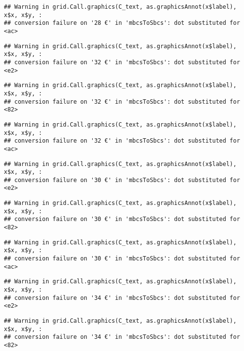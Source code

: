 \documentclass[
]{article}
\begin{document}
\begin{verbatim}
## Warning in grid.Call.graphics(C_text, as.graphicsAnnot(x$label), x$x, x$y, :
## conversion failure on '28 €' in 'mbcsToSbcs': dot substituted for <ac>
\end{verbatim}

\begin{verbatim}
## Warning in grid.Call.graphics(C_text, as.graphicsAnnot(x$label), x$x, x$y, :
## conversion failure on '32 €' in 'mbcsToSbcs': dot substituted for <e2>
\end{verbatim}

\begin{verbatim}
## Warning in grid.Call.graphics(C_text, as.graphicsAnnot(x$label), x$x, x$y, :
## conversion failure on '32 €' in 'mbcsToSbcs': dot substituted for <82>
\end{verbatim}

\begin{verbatim}
## Warning in grid.Call.graphics(C_text, as.graphicsAnnot(x$label), x$x, x$y, :
## conversion failure on '32 €' in 'mbcsToSbcs': dot substituted for <ac>
\end{verbatim}

\begin{verbatim}
## Warning in grid.Call.graphics(C_text, as.graphicsAnnot(x$label), x$x, x$y, :
## conversion failure on '30 €' in 'mbcsToSbcs': dot substituted for <e2>
\end{verbatim}

\begin{verbatim}
## Warning in grid.Call.graphics(C_text, as.graphicsAnnot(x$label), x$x, x$y, :
## conversion failure on '30 €' in 'mbcsToSbcs': dot substituted for <82>
\end{verbatim}

\begin{verbatim}
## Warning in grid.Call.graphics(C_text, as.graphicsAnnot(x$label), x$x, x$y, :
## conversion failure on '30 €' in 'mbcsToSbcs': dot substituted for <ac>
\end{verbatim}

\begin{verbatim}
## Warning in grid.Call.graphics(C_text, as.graphicsAnnot(x$label), x$x, x$y, :
## conversion failure on '34 €' in 'mbcsToSbcs': dot substituted for <e2>
\end{verbatim}

\begin{verbatim}
## Warning in grid.Call.graphics(C_text, as.graphicsAnnot(x$label), x$x, x$y, :
## conversion failure on '34 €' in 'mbcsToSbcs': dot substituted for <82>
\end{verbatim}
\end{document}
